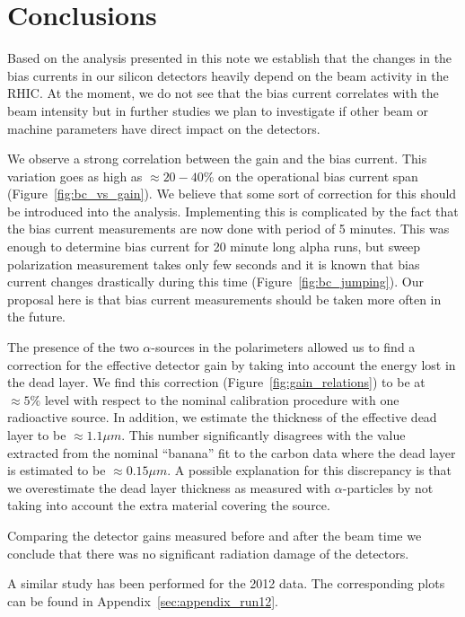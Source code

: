 \documentclass[a4paper,12pt]{article}
\begin{document}
\section{Conclusions}

Based on the analysis presented in this note we establish that the changes in
the bias currents in our silicon detectors heavily depend on the beam activity
in the RHIC. At the moment, we do not see that the bias current correlates with
the beam intensity but in further studies we plan to investigate if other beam
or machine parameters have direct impact on the detectors.

We observe a strong correlation between the gain and the bias current.
This variation goes as high as $\approx 20-40\%$ on the operational bias current
span (Figure~\ref{fig:bc_vs_gain}). We believe that some sort of correction for
this should be introduced into the analysis. Implementing this is complicated by
the fact that the bias current measurements are now done with period of 5 minutes.
This was enough to determine bias current for 20 minute long alpha runs, but
sweep polarization measurement takes only few seconds and it is known that
bias current changes drastically during this time (Figure~\ref{fig:bc_jumping}).
Our proposal here is that bias current measurements should be taken
more often in the future.

The presence of the two $\alpha$-sources in the polarimeters allowed us to find
a correction for the effective detector gain by taking into account the energy
lost in the dead layer. We find this correction (Figure~\ref{fig:gain_relations}) to be at $\approx 5\%$ level
with respect to the nominal calibration procedure with one radioactive source.
In addition, we estimate the thickness of the effective dead layer to be
$\approx 1.1\mu m$. This number significantly disagrees with the value extracted
from the nominal ``banana'' fit to the carbon data where the dead layer is
estimated to be $\approx 0.15\mu m$. A possible explanation for this discrepancy
is that we overestimate the dead layer thickness as measured with
$\alpha$-particles by not taking into account the extra material covering the
source.

Comparing the detector gains measured before and after the beam time we conclude
that there was no significant radiation damage of the detectors.

A similar study has been performed for the 2012 data. The corresponding plots
can be found in Appendix~\ref{sec:appendix_run12}.
\end{document}
